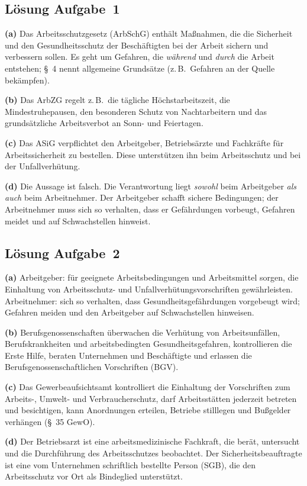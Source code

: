 \documentclass[11pt, a4paper]{article}
\begin{document}
\subsection*{Lösung Aufgabe~1}
\begin{loesung}
\textbf{(a)} Das Arbeitsschutzgesetz (ArbSchG) enthält Maßnahmen, die die Sicherheit und
den Gesundheitsschutz der Beschäftigten bei der Arbeit sichern und verbessern sollen. Es
geht um Gefahren, die \emph{während} und \emph{durch} die Arbeit entstehen; \S~4 nennt
allgemeine Grundsätze (z.\,B.\ Gefahren an der Quelle bekämpfen).

\textbf{(b)} Das ArbZG regelt z.\,B.\ die tägliche Höchstarbeitszeit, die
Mindestruhepausen, den besonderen Schutz von Nachtarbeitern und das grundsätzliche
Arbeitsverbot an Sonn- und Feiertagen.

\textbf{(c)} Das ASiG verpflichtet den Arbeitgeber, Betriebsärzte und Fachkräfte für
Arbeitssicherheit zu bestellen. Diese unterstützen ihn beim Arbeitsschutz und bei der
Unfallverhütung.

\textbf{(d)} Die Aussage ist falsch. Die Verantwortung liegt \emph{sowohl} beim Arbeitgeber
\emph{als auch} beim Arbeitnehmer. Der Arbeitgeber schafft sichere Bedingungen; der
Arbeitnehmer muss sich so verhalten, dass er Gefährdungen vorbeugt, Gefahren meidet und auf
Schwachstellen hinweist.
\end{loesung}

\subsection*{Lösung Aufgabe~2}
\begin{loesung}
\textbf{(a)} Arbeitgeber: für geeignete Arbeitsbedingungen und Arbeitsmittel sorgen, die
Einhaltung von Arbeitsschutz- und Unfallverhütungsvorschriften gewährleisten. Arbeitnehmer:
sich so verhalten, dass Gesundheitsgefährdungen vorgebeugt wird; Gefahren meiden und den
Arbeitgeber auf Schwachstellen hinweisen.

\textbf{(b)} Berufsgenossenschaften überwachen die Verhütung von Arbeitsunfällen,
Berufskrankheiten und arbeitsbedingten Gesundheitsgefahren, kontrollieren die Erste Hilfe,
beraten Unternehmen und Beschäftigte und erlassen die Berufsgenossenschaftlichen
Vorschriften (BGV).

\textbf{(c)} Das Gewerbeaufsichtsamt kontrolliert die Einhaltung der Vorschriften zum
Arbeits-, Umwelt- und Verbraucherschutz, darf Arbeitsstätten jederzeit betreten und
besichtigen, kann Anordnungen erteilen, Betriebe stilllegen und Bußgelder verhängen
(\S~35 GewO).

\textbf{(d)} Der Betriebsarzt ist eine arbeitsmedizinische Fachkraft, die berät, untersucht
und die Durchführung des Arbeitsschutzes beobachtet. Der Sicherheitsbeauftragte ist eine
vom Unternehmen schriftlich bestellte Person (SGB), die den Arbeitsschutz vor Ort als
Bindeglied unterstützt.
\end{loesung}
\end{document}
